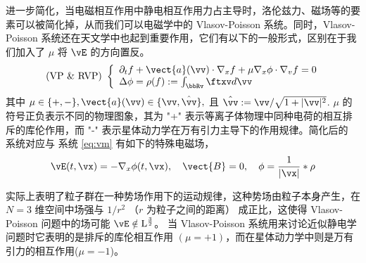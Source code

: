 进一步简化，当电磁相互作用中静电相互作用力占主导时，洛伦兹力、磁场等的要素可以被简化掉，从而我们可以电磁学中的 Vlasov-Poisson 系统。同时，Vlasov-Poisson 系统还在天文学中也起到重要作用，它们有以下的一般形式，区别在于我们加入了 $\mu$ 将 $\vE$ 的方向置反。
\begin{equation}
    \label{eq:vp}
    \text { (VP \& RVP) }\left\{\begin{array}{l}
    \partial_{t} f+\vect{a}(\vv ) \cdot \nabla_{x} f+\mu \nabla_{x} \phi \cdot \nabla_{v} f=0 \\
    \Delta \phi=\rho(f):=\int_{\bbRv} \ftxv d \vv
\end{array}\right.\end{equation}
其中 $\mu \in\{+,-\}, \vect{a}(\vv) \in\{\vv, \hat{\vv}\},$ 且 $\hat{\vv}:=\vv / \sqrt{1+|\vv|^{2}}$. 
$\mu$ 的符号正负表示不同的物理图象，其为 "+" 表示等离子体物理中同种电荷的相互排斥的库伦作用，而 "-" 表示星体动力学在万有引力主导下的作用规律。简化后的 \eqvp 系统对应与 \eqvm 系统 \ref{eq:vm} 有如下的特殊电磁场，
\begin{equation}
    \vE(t, \vx)=-\nabla_{x} \phi(t, \vx), \quad \vect{B}=0, \quad \phi= \frac{1}{|\vx|} *\rho 
\end{equation}

\eqvp 实际上表明了粒子群在一种势场作用下的运动规律，这种势场由粒子本身产生，在 $N=3$ 维空间中场强与 $1/r^{2}$ （$r$ 为粒子之间的距离） 成正比，这使得 Vlasov-Poisson 问题中的场可能 $\vE \notin \mathrm{L}^{\frac{3}{2}}$。%
当 Vlasov-Poisson 系统用来讨论近似静电学问题时它表明的是排斥的库伦相互作用 $(\mu=+1)$，而在星体动力学中则是万有引力的相互作用($\mu = -1$)。

